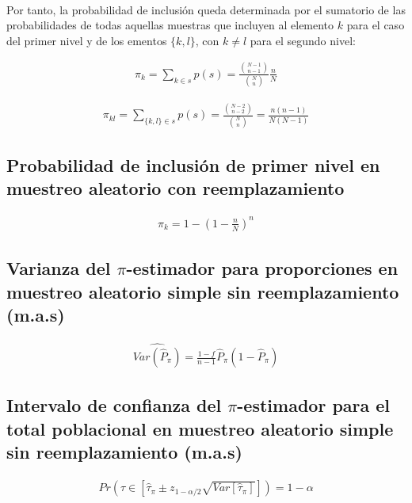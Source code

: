 \documentclass{article}
\begin{document}
      \paragraph{}
      Por tanto, la probabilidad de inclusión queda determinada por el sumatorio de las probabilidades de todas aquellas muestras que incluyen al elemento $k$ para el caso del primer nivel y de los ementos $\{k, l\}$, con $k \neq l$ para el segundo nivel:

      \begin{align}
        \pi_k = \sum_{k \in s}p(s) = \frac{\binom{N-1}{n-1}}{\binom{N}{n}}\frac{n}{N}
      \end{align}

      \begin{align}
        \pi_{kl} = \sum_{\{k,l\} \in s}p(s) = \frac{\binom{N-2}{n-2}}{\binom{N}{n}} = \frac{n(n-1)}{N(N-1)}
      \end{align}

    \subsection{Probabilidad de inclusión de primer nivel en muestreo aleatorio con reemplazamiento}

      \begin{align}
        \pi_k = 1 - \left(1 - \frac{n}{N}\right)^n
      \end{align}

    \subsection{Varianza del $\pi$-estimador para proporciones en muestreo aleatorio simple sin reemplazamiento (m.a.s)}


      \begin{align}
        \widehat{Var(\widehat{P}_\pi)} = \frac{1-f}{n-1}\widehat{P}_\pi(1-\widehat{P}_\pi)
      \end{align}

    \subsection{Intervalo de confianza del $\pi$-estimador para el total poblacional en muestreo aleatorio simple sin reemplazamiento (m.a.s)}

      \begin{align}
        Pr\left(\tau \in \left[\widehat{\tau}_\pi \pm z_{1-\alpha/2}\sqrt{Var[\widehat{\tau}_\pi]}\right]\right) = 1-\alpha
      \end{align}
	\nocite{muest2017}

  
  
\end{document}

